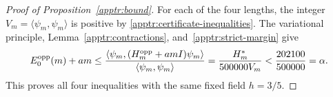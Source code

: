 \begin{proof}[Proof of Proposition~\ref{apptr:bound}]
For each of the four lengths, the integer
$V_m=\langle\psi_m,\psi_m\rangle$ is positive by
\eqref{apptr:certificate-inequalities}.  The variational principle,
Lemma~\ref{apptr:contractions}, and~\eqref{apptr:strict-margin} give
\[
 E_0^{\mathrm{opp}}(m)+am
 \le\frac{\langle\psi_m,(H_m^{\mathrm{opp}}+amI)\psi_m\rangle}
          {\langle\psi_m,\psi_m\rangle}
 =\frac{H_m^*}{500000V_m}
 <\frac{202100}{500000}
 =\alpha.
\]
This proves all four inequalities with the same fixed field $h=3/5$.
\end{proof}
